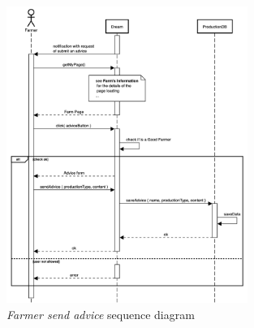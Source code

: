 \begin{enumerate}
    \begin{figure}[H]
        \begin{center}
        \includegraphics[width=0.7\textwidth]{sequence/AdviceSubmit.png}
        \caption{\emph{Farmer send advice} sequence diagram}
        \label{fig:sequence8}
        \end{center}
    \end{figure}


\end{enumerate}

